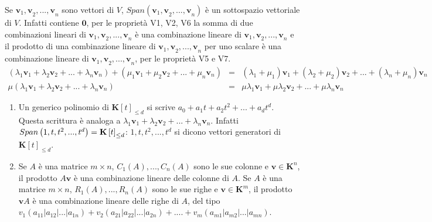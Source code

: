 \documentclass{article}
\begin{document}
Se $\mathbf{v}_{1}\mathbf{,v}_{2}\mathbf{,...,v}_{n}$ sono vettori di $V$, $%
Span\left( \mathbf{v}_{1}\mathbf{,v}_{2}\mathbf{,...,v}_{n}\right) $ \`{e}
un sottospazio vettoriale di $V$. Infatti contiene $\mathbf{0}$, per le
propriet\`{a} V1, V2, V6 la somma di due combinazioni lineari di $\mathbf{v}%
_{1}\mathbf{,v}_{2}\mathbf{,...,v}_{n}$ \`{e} una combinazione lineare di $%
\mathbf{v}_{1}\mathbf{,v}_{2}\mathbf{,...,v}_{n}$ e il prodotto di una
combinazione lineare di $\mathbf{v}_{1}\mathbf{,v}_{2}\mathbf{,...,v}_{n}$
per uno scalare \`{e} una combinazione lineare di $\mathbf{v}_{1}\mathbf{,v}%
_{2}\mathbf{,...,v}_{n}$, per le propriet\`{a} V5 e V7.%
\begin{eqnarray*}
\left( \lambda _{1}\mathbf{v}_{1}+\lambda _{2}\mathbf{v}_{2}+...+\lambda _{n}%
\mathbf{v}_{n}\right) +\left( \mu _{1}\mathbf{v}_{1}+\mu _{2}\mathbf{v}%
_{2}+...+\mu _{n}\mathbf{v}_{n}\right) &=&\left( \lambda _{1}+\mu
_{1}\right) \mathbf{v}_{1}+\left( \lambda _{2}+\mu _{2}\right) \mathbf{v}%
_{2}+...+\left( \lambda _{n}+\mu _{n}\right) \mathbf{v}_{n} \\
\mu \left( \lambda _{1}\mathbf{v}_{1}+\lambda _{2}\mathbf{v}_{2}+...+\lambda
_{n}\mathbf{v}_{n}\right) &=&\mu \lambda _{1}\mathbf{v}_{1}+\mu \lambda _{2}%
\mathbf{v}_{2}+...+\mu \lambda _{n}\mathbf{v}_{n}
\end{eqnarray*}

\begin{enumerate}
\item Un generico polinomio di $\mathbf{K}\left[ t\right] _{\leq d}$ si
scrive $a_{0}+a_{1}t+a_{2}t^{2}+...+a_{d}t^{d}$. Questa scrittura \`{e}
analoga a $\lambda _{1}\mathbf{v}_{1}+\lambda _{2}\mathbf{v}_{2}+...+\lambda
_{n}\mathbf{v}_{n}$. Infatti $Span\left( 1,t,t^{2},...,t^{d}\right) =\mathbf{%
K}\left[ t\right] _{\leq d}$: $1,t,t^{2},...,t^{d}$ si dicono vettori
generatori di $\mathbf{K}\left[ t\right] _{\leq d}$.

\item Se $A$ \`{e} una matrice $m\times n$, $C_{1}\left( A\right)
,...,C_{n}\left( A\right) $ sono le sue colonne e $\mathbf{v\in K}^{n}$, il
prodotto $A\mathbf{v}$ \`{e} una combinazione lineare delle colonne di $A$.
Se $A$ \`{e} una matrice $m\times n$, $R_{1}\left( A\right) ,...,R_{n}\left(
A\right) $ sono le sue righe e $\mathbf{v\in K}^{m}$, il prodotto $\mathbf{v}%
A$ \`{e} una combinazione lineare delle righe di $A$, del tipo $v_{1}\left(
a_{11}|a_{12}|...|a_{1n}\right) +v_{2}\left( a_{21}|a_{22}|...|a_{2n}\right)
+....+v_{m}\left( a_{m1}|a_{m2}|...|a_{mn}\right) $.
\end{enumerate}
\end{document}
